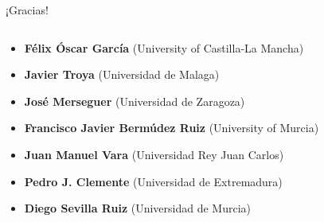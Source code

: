\begin{frame}{¡Gracias!}
{\begin{columns}
\begin{column}{0.5\textwidth}
\begin{itemize}
  \item {\bf Félix Óscar García} (University of Castilla-La Mancha)
  \item {\bf Javier Troya} (Universidad de Malaga)
  \item {\bf José Merseguer} (Universidad de Zaragoza)
  \item {\bf Francisco Javier Bermúdez Ruiz} (University of Murcia)
  \item {\bf Juan Manuel Vara} (Universidad Rey Juan Carlos)
  \item {\bf Pedro J. Clemente} (Universidad de Extremadura)
  \item {\bf Diego Sevilla Ruiz} (Universidad de Murcia)
    \end{itemize}
  \end{column}
\end{columns}%
}
\end{frame}




